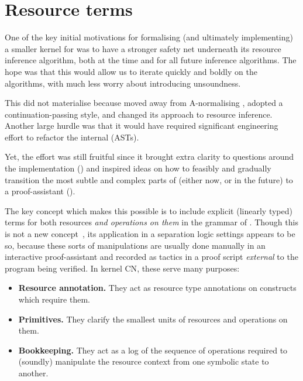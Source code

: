\section{Resource terms}\label{sec:res-terms}

One of the key initial motivations for formalising (and ultimately
implementing) a smaller kernel for  was to have a stronger safety net
underneath its resource inference algorithm, both at the time and for all
future inference algorithms. The hope was that this would allow us to iterate
quickly and boldly on the algorithms, with much less worry about introducing
unsoundness.

This did not materialise because  moved away from A-normalising
, adopted a continuation-passing style, and changed its approach to
resource inference. Another large hurdle was that it would have required
significant engineering effort to refactor the internal  (ASTs).

Yet, the effort was still fruitful since it brought extra clarity to questions
around the implementation () and inspired ideas on
how to feasibly and gradually transition the most subtle and complex parts of
 (either now, or in the future) to a
proof-assistant ().

The key concept which makes this possible is to include explicit (linearly
typed) terms for both resources \emph{and operations on them} in the grammar of
. Though this is not a new
concept~, its application in a
separation logic settings appears to be so, because these sorts of
manipulations are usually done manually in an interactive proof-assistant and
recorded as tactics in a proof script \emph{external} to the program being
verified. In {kernel CN}, these  serve many purposes:
\begin{itemize}
    \item \textbf{Resource annotation.} They act as resource type annotations
        on constructs which require them.
    \item \textbf{Primitives.} They clarify the smallest units of
        resources and operations on them.
    \item \textbf{Bookkeeping.} They act as a log of the sequence of operations
        required to (soundly) manipulate the resource context from one symbolic
        state to another.
\end{itemize}


